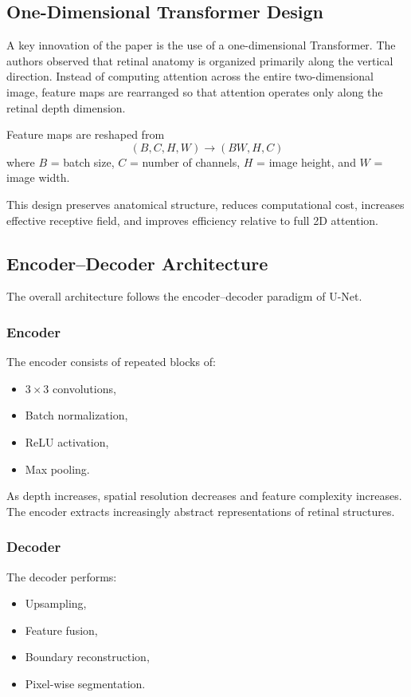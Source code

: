 \documentclass[11pt]{article}
\begin{document}
\subsection*{One-Dimensional Transformer Design}

A key innovation of the paper is the use of a one-dimensional Transformer.
The authors observed that retinal anatomy is organized primarily along the vertical direction.
Instead of computing attention across the entire two-dimensional image, feature maps are rearranged so that attention operates only along the retinal depth dimension.

Feature maps are reshaped from $$(B,C,H,W) \rightarrow (BW,H,C)$$ where $B$ = batch size, $C$ = number of channels, $H$ = image height, and $W$ = image width.

This design preserves anatomical structure, reduces computational cost, increases effective receptive field, and improves efficiency relative to full 2D attention.

\subsection*{Encoder--Decoder Architecture}

The overall architecture follows the encoder--decoder paradigm of U-Net.

\subsubsection*{Encoder}

The encoder consists of repeated blocks of:
\begin{itemize}
    \item $3\times3$ convolutions,
    \item Batch normalization,
    \item ReLU activation,
    \item Max pooling.
\end{itemize}
As depth increases, spatial resolution decreases and feature complexity increases. The encoder extracts increasingly abstract representations of retinal structures.

\subsubsection*{Decoder}

The decoder performs:

\begin{itemize}
    \item Upsampling,
    \item Feature fusion,
    \item Boundary reconstruction,
    \item Pixel-wise segmentation.
\end{itemize}
\end{document}
